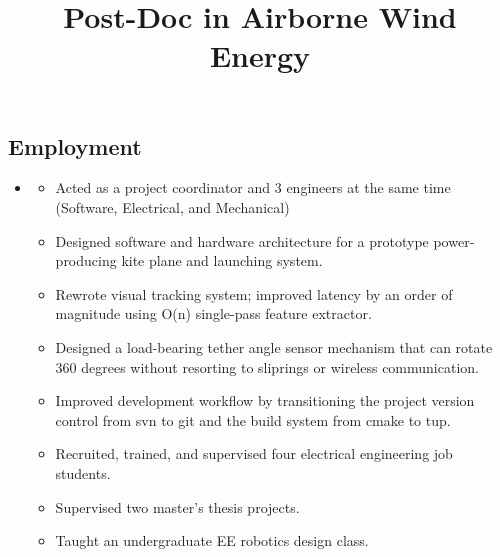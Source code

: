 \documentclass[line,lm,rm,11pt]{res} %
\def\spaceline{\vspace{1mm} \fullline}
\begin{document}
\begin{resume}
\section{Employment}
\begin{itemize}
\item
	\spaceline
	\title{\bf Post-Doc in Airborne Wind Energy }
	\begin{position}
	\vspace{-2mm}
	\begin{itemize}
		\item Acted as a project coordinator and 3 engineers at the same time (Software, Electrical, and Mechanical)
		\item Designed software and hardware architecture for a prototype power-producing kite plane and launching system.
		\item Rewrote visual tracking system; improved latency by an order of magnitude using O(n) single-pass feature extractor.
		\item Designed a load-bearing tether angle sensor mechanism that can rotate 360 degrees without resorting to sliprings or wireless communication.
		\item Improved development workflow by transitioning the project version control from svn to git and the build system from cmake to tup.
		\item Recruited, trained, and supervised four electrical engineering job students.
		\item Supervised two master's thesis projects.
		\item Taught an undergraduate EE robotics design class.


\end{itemize}
\end{position}
\end{itemize}
\end{resume}
\end{document}
